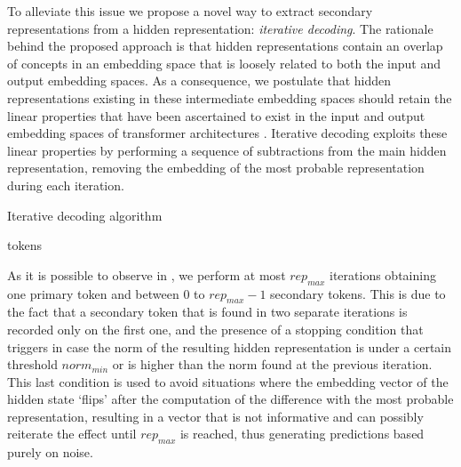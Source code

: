 To alleviate this issue we propose a novel way to extract secondary representations from a hidden representation: \emph{iterative decoding}.
The rationale behind the proposed approach is that hidden representations contain an overlap of concepts in an embedding space that is loosely related to both the input and output embedding spaces.
As a consequence, we postulate that hidden representations existing in these intermediate embedding spaces should retain the linear properties that have been ascertained to exist in the input and output embedding spaces of transformer architectures .
Iterative decoding exploits these linear properties by performing a sequence of subtractions from the main hidden representation, removing the embedding of the most probable representation during each iteration.
\begin{algorithm}
    \caption{Iterative decoding algorithm}\label{alg:method_intravisto_iter-dec}
    \begin{algorithmic}
            \ENDIF{}
            \ENDIF{}
        \ENDWHILE{}
        \RETURN tokens
    \end{algorithmic}
\end{algorithm}
As it is possible to observe in , we perform at most ${rep}_{max}$ iterations obtaining one primary token and between $0$ to ${rep}_{max} - 1$ secondary tokens.
This is due to the fact that a secondary token that is found in two separate iterations is recorded only on the first one, and the presence of a stopping condition that triggers in case the norm of the resulting hidden representation is under a certain threshold ${norm}_{min}$ or is higher than the norm found at the previous iteration.
This last condition is used to avoid situations where the embedding vector of the hidden state `flips' after the computation of the difference with the most probable representation, resulting in a vector that is not informative and can possibly reiterate the effect until ${rep}_{max}$ is reached, thus generating predictions based purely on noise. 

